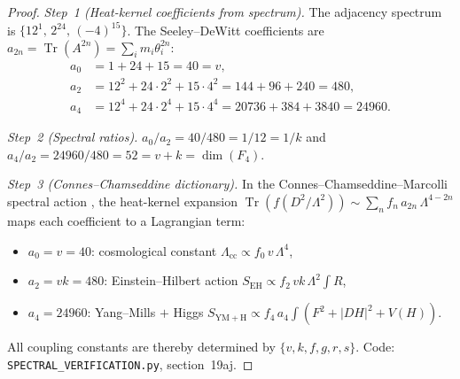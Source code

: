 \documentclass[12pt,a4paper]{article}
\begin{document}
\begin{proof}
\emph{Step~1 (Heat-kernel coefficients from spectrum).}
The adjacency spectrum is $\{12^1,\, 2^{24},\, (-4)^{15}\}$.
The Seeley--DeWitt coefficients are $a_{2n} = \operatorname{Tr}(A^{2n})
= \sum_i m_i \theta_i^{2n}$:
\begin{align*}
  a_0 &= 1 + 24 + 15 = 40 = v, \\
  a_2 &= 12^2 + 24 \cdot 2^2 + 15 \cdot 4^2
       = 144 + 96 + 240 = 480, \\
  a_4 &= 12^4 + 24 \cdot 2^4 + 15 \cdot 4^4
       = 20736 + 384 + 3840 = 24960.
\end{align*}

\emph{Step~2 (Spectral ratios).}
$a_0/a_2 = 40/480 = 1/12 = 1/k$ and
$a_4/a_2 = 24960/480 = 52 = v + k = \dim(F_4)$.

\emph{Step~3 (Connes--Chamseddine dictionary).}
In the Connes--Chamseddine--Marcolli spectral action
\cite{connes:spectral-action}, the heat-kernel expansion
$\operatorname{Tr}(f(D^2/\Lambda^2)) \sim \sum_n f_n\, a_{2n}\,
\Lambda^{4-2n}$ maps each coefficient to a Lagrangian term:
\begin{itemize}
  \item $a_0 = v = 40$: cosmological constant $\Lambda_{\mathrm{cc}}
    \propto f_0\, v\, \Lambda^4$,
  \item $a_2 = vk = 480$: Einstein--Hilbert action
    $S_{\mathrm{EH}} \propto f_2\, vk\, \Lambda^2 \int R$,
  \item $a_4 = 24960$: Yang--Mills $+$ Higgs
    $S_{\mathrm{YM+H}} \propto f_4\, a_4 \int (F^2 + |DH|^2 + V(H))$.
\end{itemize}
All coupling constants are thereby determined by $\{v, k, f, g, r, s\}$.
Code: \texttt{SPECTRAL\_VERIFICATION.py}, section~19aj.
\end{proof}

\end{document}
